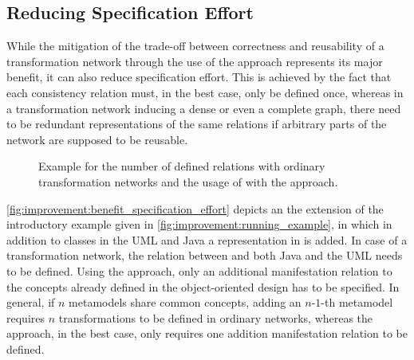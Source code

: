 

\subsection{Reducing Specification Effort}
\label{chap:improvement:benefits:specification_effort}

While the mitigation of the trade-off between correctness and reusability of a transformation network through the use of the \commonalities approach represents its major benefit, it can also reduce specification effort.
This is achieved by the fact that each consistency relation must, in the best case, only be defined once, whereas in a transformation network inducing a dense or even a complete graph, there need to be redundant representations of the same relations if arbitrary parts of the network are supposed to be reusable.

\begin{figure}
    \centering
    
    \caption[Benefit of \commonalities regarding specification effort]{Example for the number of defined relations with ordinary transformation networks and the usage of \conceptmetamodels with the \commonalities approach.}
    \label{fig:improvement:benefit_specification_effort}
\end{figure}

\autoref{fig:improvement:benefit_specification_effort} depicts an the extension of the introductory example given in \autoref{fig:improvement:running_example}, in which in addition to classes in the \gls{UML} and Java a representation in \cplusplus is added.
In case of a transformation network, the relation between \cplusplus and both Java and the \gls{UML} needs to be defined.
Using the \commonalities approach, only an additional manifestation relation to the concepts already defined in the object-oriented design \conceptmetamodels has to be specified.
In general, if $n$ metamodels share common concepts, adding an $n$-$1$-th metamodel requires $n$ transformations to be defined in ordinary networks, whereas the \commonalities approach, in the best case, only requires one addition manifestation relation to be defined.

